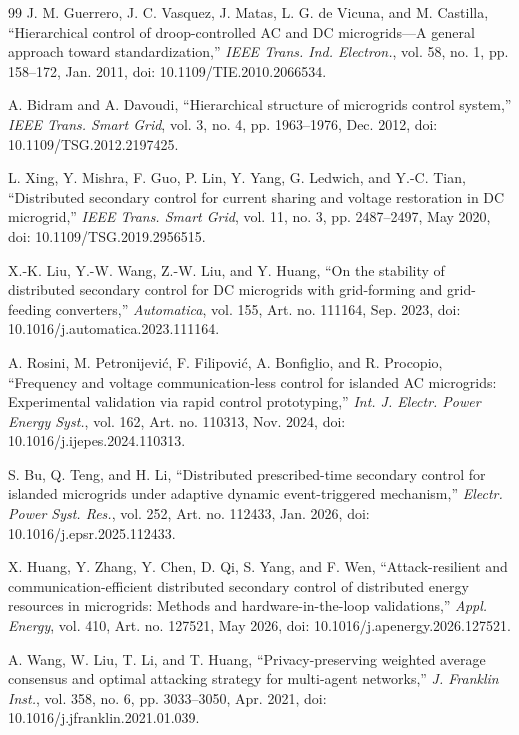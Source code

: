 \documentclass[journal]{IEEEtran}
\begin{document}
\begin{thebibliography}{99}
J. M. Guerrero, J. C. Vasquez, J. Matas, L. G. de Vicuna, and M. Castilla,
``Hierarchical control of droop-controlled AC and DC microgrids---A general
approach toward standardization,'' \emph{IEEE Trans. Ind. Electron.}, vol. 58,
no. 1, pp. 158--172, Jan. 2011, doi: 10.1109/TIE.2010.2066534.

A. Bidram and A. Davoudi, ``Hierarchical structure of microgrids control
system,'' \emph{IEEE Trans. Smart Grid}, vol. 3, no. 4, pp. 1963--1976,
Dec. 2012, doi: 10.1109/TSG.2012.2197425.

L. Xing, Y. Mishra, F. Guo, P. Lin, Y. Yang, G. Ledwich, and Y.-C. Tian,
``Distributed secondary control for current sharing and voltage restoration
in DC microgrid,'' \emph{IEEE Trans. Smart Grid}, vol. 11, no. 3,
pp. 2487--2497, May 2020, doi: 10.1109/TSG.2019.2956515.

X.-K. Liu, Y.-W. Wang, Z.-W. Liu, and Y. Huang, ``On the stability of
distributed secondary control for DC microgrids with grid-forming and
grid-feeding converters,'' \emph{Automatica}, vol. 155, Art. no. 111164,
Sep. 2023, doi: 10.1016/j.automatica.2023.111164.

A. Rosini, M. Petronijevi\'c, F. Filipovi\'c, A. Bonfiglio, and R. Procopio,
``Frequency and voltage communication-less control for islanded AC microgrids:
Experimental validation via rapid control prototyping,'' \emph{Int. J. Electr.
Power Energy Syst.}, vol. 162, Art. no. 110313, Nov. 2024,
doi: 10.1016/j.ijepes.2024.110313.

S. Bu, Q. Teng, and H. Li, ``Distributed prescribed-time secondary control
for islanded microgrids under adaptive dynamic event-triggered mechanism,''
\emph{Electr. Power Syst. Res.}, vol. 252, Art. no. 112433, Jan. 2026,
doi: 10.1016/j.epsr.2025.112433.

X. Huang, Y. Zhang, Y. Chen, D. Qi, S. Yang, and F. Wen, ``Attack-resilient
and communication-efficient distributed secondary control of distributed
energy resources in microgrids: Methods and hardware-in-the-loop
validations,'' \emph{Appl. Energy}, vol. 410, Art. no. 127521, May 2026,
doi: 10.1016/j.apenergy.2026.127521.

A. Wang, W. Liu, T. Li, and T. Huang, ``Privacy-preserving weighted average
consensus and optimal attacking strategy for multi-agent networks,''
\emph{J. Franklin Inst.}, vol. 358, no. 6, pp. 3033--3050, Apr. 2021,
doi: 10.1016/j.jfranklin.2021.01.039.


\end{thebibliography}
\end{document}
